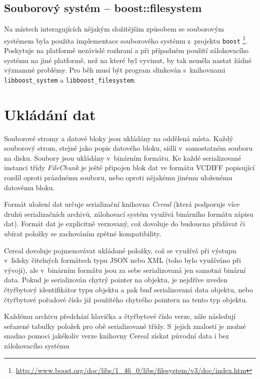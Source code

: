 \subsection*{Souborový systém -- boost::filesystem}

Na místech interagujících nějakým složitějším způsobem se souborovým systémem
byla použita implementace souborového systému z~\Cpp projektu \texttt{boost}%
\footnote{\url{http://www.boost.org/doc/libs/1_46_0/libs/filesystem/v3/doc/index.htm}}.
Poskytuje na platformě nezávislé rozhraní a při případném použití zálohovacího
systému na jiné platformě, než na které byl vyvinut, by tak neměla nastat žádné
významné problémy. Pro běh musí být program slinkován s~knihovnami
\texttt{libboost\_system} a \texttt{libboost\_filesystem}.

\section{Ukládání dat}

Souborové stromy a datové bloky jsou ukládány na oddělená místa. Každý souborový
strom, stejně jako popis datového bloku, sídlí v~samostatném souboru na disku.
Soubory jsou ukládány v~binárním formátu. Ke každé serializované instanci třídy
{\it FileChunk} je ještě připojen blok dat ve formátu \gls{VCDIFF} popisující
rozdíl oproti prázdnému souboru, nebo oproti nějakému jinému uloženému datovému
bloku.

Formát uložení dat určuje serializační knihovna {\it Cereal} (která podporuje
více druhů serializačních archivů, zálohovací systém využívá binárního formátu
zápisu dat). Formát dat je explicitně verzovaný, což dovoluje do budoucna
přidávat či ubírat položky se zachováním zpětné kompatibility.

Cereal dovoluje pojmenovávat ukládané položky, což se využívá při výstupu
v~lidsky čitelných formátech typu JSON nebo XML (toho bylo využíváno při vývoji),
ale v~binárním formátu jsou za sebe serializovaná jen samotná binární data. Pokud
je serializován chytrý pointer na objektu, je nejdříve uveden čtyřbytový
identifikátor typu objektu a pak buď serializovaná data objektu, nebo čtyřbytové
pořadové číslo již použitého chytrého pointeru na tento typ objektu.

Každému archivu předchází hlavička a čtyřbytové číslo verze, níže následují
seřazené tabulky položek pro obě serializované třídy. S~jejich znalostí je možné
snadno pomoci jakékoliv verze knihovny Cereal získat původní data i bez
zálohovacího systému

